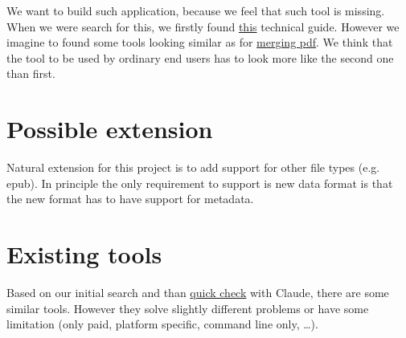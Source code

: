 \documentclass[11pt]{article}
\begin{document}
We want to build such application, because we feel that such tool is missing.
When we were search for this, we firstly found \href{https://pdfa.org/defending-your-pdfs-from-ai-scraping/}{this} technical guide.
However we imagine to found some tools looking similar as for \href{https://www.ilovepdf.com/merge_pdf}{merging pdf}.
We think that the tool to be used by ordinary end users has to look more like the second one than first.

\section*{Possible extension}

Natural extension for this project is to add support for other file types (e.g. epub).
In principle the only requirement to support is new data format is that the new format has to have support for metadata.

\section*{Existing tools}

Based on our initial search and than \href{https://claude.ai/share/48a1993a-63c7-42f8-a55d-212b0818a9cf}{quick check} with Claude,
there are some similar tools.
However they solve slightly different problems or have some limitation
(only paid, platform specific, command line only, \dots ).
\end{document}
